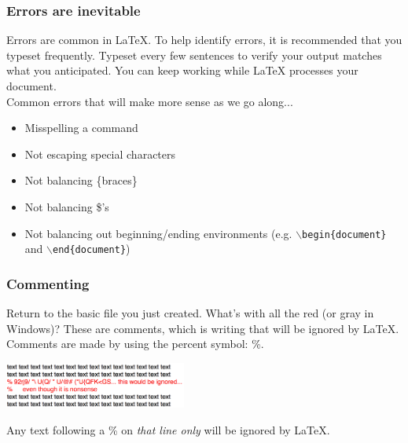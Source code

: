\documentclass[slidestop,compress,mathserif]{beamer}
\begin{document}
\begin{frame} \frametitle{Errors are inevitable}
Errors are common in LaTeX. To help identify errors, it is recommended that you typeset frequently. Typeset every few sentences to verify your output matches what you anticipated. You can keep working while LaTeX processes your document. \\
\vspace{0.7cm}
Common errors that will make more sense as we go along...
\begin{itemize}
\item Misspelling a command
\item Not escaping special characters
\item Not balancing {\color{braces}\{}braces{\color{braces}\}}
\item Not balancing {\color{braces}\$}'s
\item Not balancing out beginning/ending environments (e.g. \texttt{\color{command}$\backslash$begin\color{braces}\{\color{black}document\color{braces}\}} and \texttt{\color{command}$\backslash$end\color{braces}\{\color{black}document\color{braces}\}})
\end{itemize}
\end{frame}

\begin{frame} \frametitle{Commenting}
Return to the basic file you just created. What's with all the red (or gray in Windows)? These are comments, which is writing that will be ignored by LaTeX. Comments are made by using the percent symbol: {\color{comment}\%}.
\begin{center}
\includegraphics[height=0.6in]{basicsOfLatex/gettingStarted/commenting}
\end{center}
Any text following a {\color{comment}\%} on \emph{that line only} will be ignored by LaTeX.
\end{frame}
\end{document}

